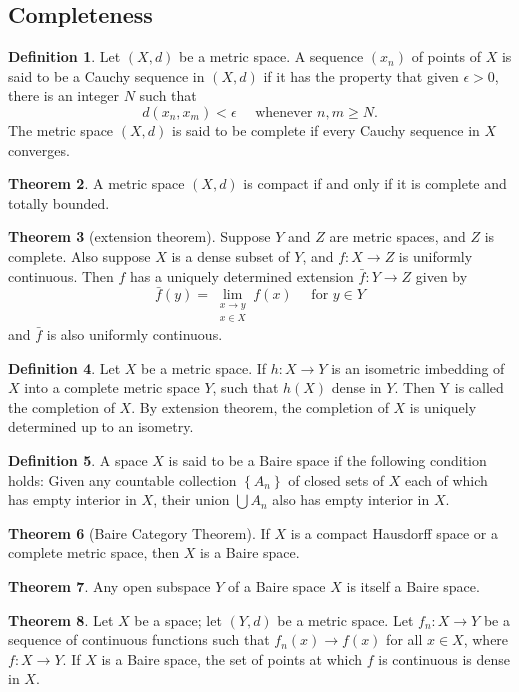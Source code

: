 \documentclass[12pt,a4paper]{book}
\theoremstyle{definition}
\newtheorem{defn}{Definition}[section]
\newtheorem{theo}[defn]{Theorem}
\begin{document}
\subsection{Completeness}
\begin{defn}
    Let $(X, d)$ be a metric space. A sequence $\left(x_n\right)$ of points of $X$ is said to be a Cauchy sequence in $(X, d)$ if it has the property that given $\epsilon>0$, there is an integer $N$ such that
    $$
        d\left(x_n, x_m\right)<\epsilon \quad \text { whenever } n, m \geq N .
    $$
    The metric space $(X, d)$ is said to be complete if every Cauchy sequence in $X$ converges.
\end{defn}
\begin{theo}
    A metric space $(X, d)$ is compact if and only if it is complete and totally bounded.
\end{theo}
\begin{theo}[extension theorem]
    Suppose $Y$ and $Z$ are metric spaces, and $Z$ is complete. Also suppose $X$ is a dense subset of $Y$, and $f: X \rightarrow Z$ is uniformly continuous. Then $f$ has a uniquely determined extension $\bar{f}: Y \rightarrow Z$ given by
    $$
        \bar{f}(y)=\lim _{\substack{x \rightarrow y \\ x \in X}} f(x) \quad \text { for } y \in Y
    $$
    and $\bar{f}$ is also uniformly continuous.
    \label{theorem:extension theorem}
\end{theo}
\begin{defn}
    Let $X$ be a metric space. If $h: X \rightarrow Y$ is an isometric imbedding of $X$ into a complete metric space $Y$, such that $h(X)$ dense in $Y$. Then Y is called the completion of $X$.
    By extension theorem, the completion of $X$ is uniquely determined up to an isometry.
\end{defn}


\begin{defn}
    A space $X$ is said to be a Baire space if the following condition holds: Given any countable collection $\left\{A_n\right\}$ of closed sets of $X$ each of which has empty interior in $X$, their union $\bigcup A_n$ also has empty interior in $X$.
\end{defn}
\begin{theo}[Baire Category Theorem]
    If $X$ is a compact Hausdorff space or a complete metric space, then $X$ is a Baire space.
\end{theo}
\begin{theo}
    Any open subspace $Y$ of a Baire space $X$ is itself a Baire space.
\end{theo}
\begin{theo}
    Let $X$ be a space; let $(Y, d)$ be a metric space. Let $f_n: X \rightarrow Y$ be a sequence of continuous functions such that $f_n(x) \rightarrow f(x)$ for all $x \in X$, where $f: X \rightarrow Y$. If $X$ is a Baire space, the set of points at which $f$ is continuous is dense in $X$.
\end{theo}
\newpage
\end{document}
